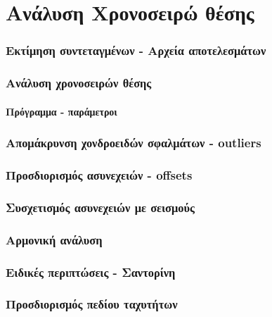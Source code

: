 \section{Ανάλυση Χρονοσειρώ θέσης}
 
\graphicspath{{Chapter2/Figs/}}

\begin{frame}
  \frametitle{Εκτίμηση συντεταγμένων - Αρχεία αποτελεσμάτων}
  \framesubtitle{}
  \label{}

\end{frame}
\note{}

\begin{frame}
  \frametitle{Ανάλυση χρονοσειρών θέσης}
  \framesubtitle{Πρόγραμμα - παράμετροι}
  \label{}

\end{frame}
\note{}


\begin{frame}
  \frametitle{Απομάκρυνση χονδροειδών σφαλμάτων - outliers}
  \framesubtitle{}
  \label{}

\end{frame}
\note{}

\begin{frame}
  \frametitle{Προσδιορισμός ασυνεχειών - offsets}
  \framesubtitle{}
  \label{}

\end{frame}
\note{}

\begin{frame}
  \frametitle{Συσχετισμός ασυνεχειών με σεισμούς}
  \framesubtitle{}
  \label{}

\end{frame}
\note{}

\begin{frame}
  \frametitle{Αρμονική ανάλυση}
  \framesubtitle{}
  \label{}

\end{frame}
\note{}

\begin{frame}
  \frametitle{Ειδικές περιπτώσεις - Σαντορίνη}
  \framesubtitle{}
  \label{}

\end{frame}
\note{}


\begin{frame}
  \frametitle{Προσδιορισμός πεδίου ταχυτήτων}
  \framesubtitle{}
  \label{}

\end{frame}
\note{}

